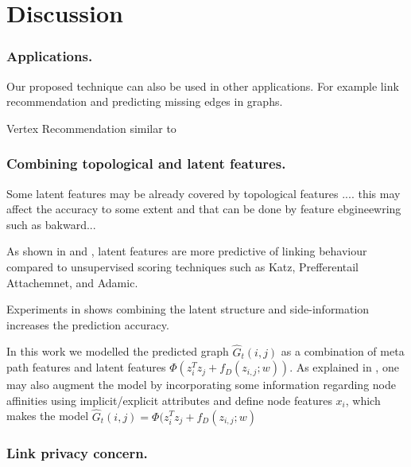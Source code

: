 \section{Discussion}


\subsubsection{Applications.} Our proposed technique can also be used in other applications. For example link recommendation and predicting missing edges in graphs.

Vertex Recommendation similar to \cite{ou2016asymmetric} 


\subsubsection{Combining topological and latent features.}

Some latent features may be already covered by topological features .... this may affect the accuracy to some extent and that can be done by feature ebgineewring such as bakward... 

As shown in \cite{menon2011link} and \cite{Zhu2016}, latent features are more predictive of linking behaviour compared to unsupervised scoring techniques such as Katz, Prefferentail Attachemnet, and Adamic.

Experiments in \cite{menon2011link} shows combining the latent structure and side-information increases the prediction accuracy.


In this work we modelled the predicted graph $ \hat{G}_t(i,j)$ as a combination of meta path features and latent features $\Phi(z_{i}^Tz_{j} + f_D(z_{i,j};w))$. As explained in \cite{menon2011link}, one may also augment the model by incorporating some information regarding node affinities using implicit/explicit attributes and define node features $x_i$, which makes the model $\hat{G}_t(i,j) = \Phi(z_{i}^Tz_{j} + f_D(z_{i,j};w)$



\subsubsection{Link privacy concern.}

